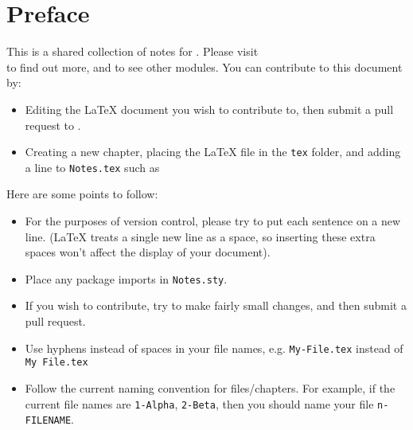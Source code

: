 \section*{Preface}
This is a shared collection of notes for \modulename. Please visit \\
\repolink to find out more, and to see other modules. You can contribute to this document by:
\begin{itemize}
	\item Editing the \LaTeX{} document you wish to contribute to, then submit a pull request to \repolink.
	\item Creating a new chapter, placing the \LaTeX{} file in the \verb|tex| folder, and adding a line to \verb|Notes.tex| such as \verb||
\end{itemize}
%
Here are some points to follow:
\begin{itemize}
	\item For the purposes of version control, please try to put each sentence on a new line. (\LaTeX{} treats a single new line as a space, so inserting these extra spaces won't affect the display of your document).
	\item Place any package imports in \verb|Notes.sty|.
	\item If you wish to contribute, try to make fairly small changes, and then submit a pull request.
	\item Use hyphens instead of spaces in your file names, e.g. \verb|My-File.tex| instead of \verb|My File.tex|
	\item Follow the current naming convention for files/chapters. For example, if the current file names are \verb|1-Alpha|, \verb|2-Beta|, then you should name your file \verb|n-FILENAME|.
\end{itemize}